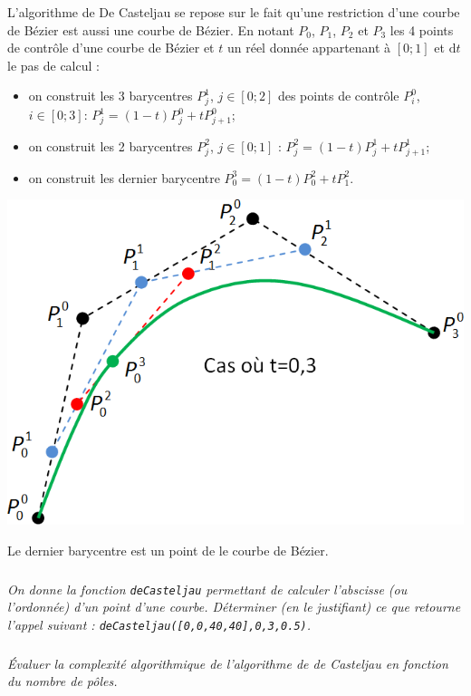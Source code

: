 \documentclass[10pt,fleqn]{article} %
\begin{document}
\begin{minipage}[c]{0.6\linewidth}
L'algorithme de De Casteljau se repose sur le fait qu'une restriction d'une courbe de Bézier est aussi une courbe de Bézier. En notant $P_0$, $P_1$, $P_2$ et $P_3$ les 4 points de contrôle d'une courbe de Bézier et $t$ un réel donnée appartenant à $[0;1]$ et $\text{d}t$ le pas de calcul : 
\begin{itemize}[label=,font=\color{ocre}] 
\item on construit les 3 barycentres $P_j^1$, $j \in [0;2]$ des points de contrôle $P_i^0$, $i\in[0;3]$: $P_j^1 = \left(1-t\right)P_j^0 + tP_{j+1}^{0}$;
\item on construit les 2 barycentres $P_j^2$, $j \in [0;1]$ : $P_j^2 = \left(1-t\right)P_j^1 + tP_{j+1}^{1}$;
\item on construit les dernier barycentre  $P_0^3 = \left(1-t\right)P_0^2 + tP_{1}^{2}$.
\end{itemize}
\end{minipage} \hfill
\begin{minipage}[c]{0.37\linewidth}
\begin{center}
\includegraphics[width=.9\linewidth]{images/casteljau}
\end{center}
\end{minipage}
Le dernier barycentre est un point de le courbe de Bézier. 


\subparagraph{}
\textit{On donne la fonction \texttt{deCasteljau} permettant de calculer l'abscisse (ou l'ordonnée) d'un point d'une courbe. Déterminer (en le justifiant) ce que retourne l'appel suivant : \texttt{deCasteljau([0,0,40,40],0,3,0.5)}.}

\subparagraph{}
\textit{Évaluer la complexité algorithmique de l'algorithme de de Casteljau en fonction du nombre de pôles.}
\end{document}
